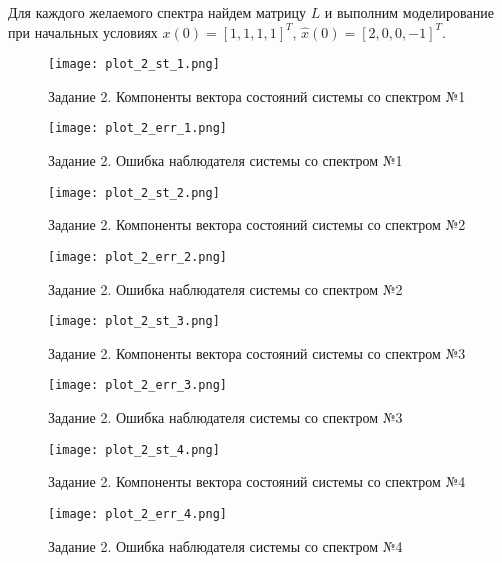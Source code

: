 Для каждого желаемого спектра найдем матрицу $L$ и выполним моделирование при начальных
условиях $x(0)=[1, 1, 1, 1]^T$, $\hat x(0)=[2, 0, 0, -1]^T$.

\begin{figure}[]
    \centering
    \texttt{[image: plot\_2\_st\_1.png]}
    \caption{\label{fig:The-caption-1}Задание 2. Компоненты вектора состояний системы со спектром №1}
\end{figure}
\begin{figure}[]
    \centering
    \texttt{[image: plot\_2\_err\_1.png]}
    \caption{\label{fig:The-caption-1}Задание 2. Ошибка наблюдателя системы со спектром №1}
\end{figure}
\begin{figure}[]
    \centering
    \texttt{[image: plot\_2\_st\_2.png]}
    \caption{\label{fig:The-caption-1}Задание 2. Компоненты вектора состояний системы со спектром №2}
\end{figure}
\begin{figure}[]
    \centering
    \texttt{[image: plot\_2\_err\_2.png]}
    \caption{\label{fig:The-caption-1}Задание 2. Ошибка наблюдателя системы со спектром №2}
\end{figure}
\begin{figure}[]
    \centering
    \texttt{[image: plot\_2\_st\_3.png]}
    \caption{\label{fig:The-caption-1}Задание 2. Компоненты вектора состояний системы со спектром №3}
\end{figure}
\begin{figure}[]
    \centering
    \texttt{[image: plot\_2\_err\_3.png]}
    \caption{\label{fig:The-caption-1}Задание 2. Ошибка наблюдателя системы со спектром №3}
\end{figure}
\begin{figure}[]
    \centering
    \texttt{[image: plot\_2\_st\_4.png]}
    \caption{\label{fig:The-caption-1}Задание 2. Компоненты вектора состояний системы со спектром №4}
\end{figure}
\begin{figure}[]
    \centering
    \texttt{[image: plot\_2\_err\_4.png]}
    \caption{\label{fig:The-caption-1}Задание 2. Ошибка наблюдателя системы со спектром №4}
\end{figure}

\pagebreak

